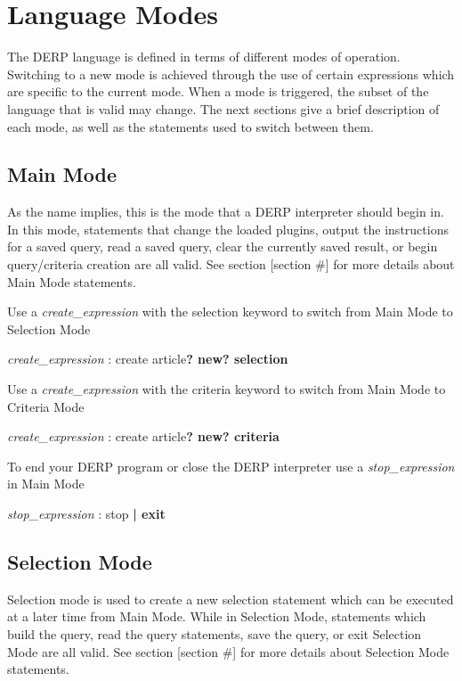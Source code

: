 \section{Language Modes}
The DERP language is defined in terms of different modes of operation. 
Switching to a new mode is achieved through the use of certain expressions 
which are specific to the current mode. When a mode is triggered, the 
subset of the language that is valid may change. The next sections give 
a brief description of each mode, as well as the statements used to switch between them.

\subsection{Main Mode}
As the name implies, this is the mode that a DERP interpreter should begin in. In this mode, 
statements that change the loaded plugins, output the instructions for a saved query, read a 
saved query, clear the currently saved result, or begin query/criteria creation are all valid. 
See section [section #] for more details about Main Mode statements.

Use a \emph{create_expression} with the selection keyword to switch from Main Mode to Selection Mode
\begin{center}
    \emph{create_expression} : create article\bf{?} new\bf{?} selection
\end{center}

Use a \emph{create_expression} with the criteria keyword to switch from Main Mode to Criteria Mode
\begin{center}
    \emph{create_expression} : create article\bf{?} new\bf{?} criteria
\end{center}

To end your DERP program or close the DERP interpreter use a \emph{stop_expression} in Main Mode
\begin{center}
    \emph{stop_expression} : stop \bf{|} exit
\end{center}

\subsection{Selection Mode}
Selection mode is used to create a new selection statement which can be executed at a later time from Main Mode. 
While in Selection Mode, statements which build the query, read the query statements, save the query, or exit 
Selection Mode are all valid. See section [section #] for more details about Selection Mode statements.


